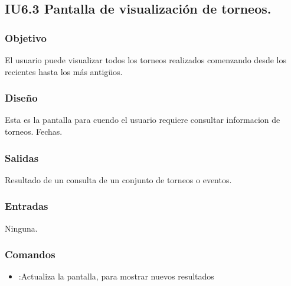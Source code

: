 
\subsection{IU6.3 Pantalla de visualización de torneos.}

\subsubsection{Objetivo}
	El usuario puede visualizar todos los torneos realizados comenzando desde los recientes hasta los más antigüos.

\subsubsection{Diseño}
Esta es la pantalla para cuendo el usuario requiere consultar informacion de torneos. Fechas.
 

\subsubsection{Salidas}

	Resultado de un consulta de un conjunto de torneos o eventos.

\subsubsection{Entradas}
	Ninguna.

\subsubsection{Comandos}
\begin{itemize}
	\item {}:Actualiza la pantalla, para mostrar nuevos resultados
\end{itemize}

